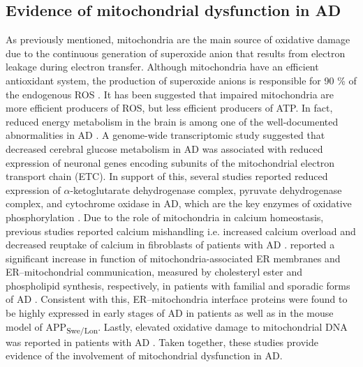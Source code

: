 \subsection{Evidence of mitochondrial dysfunction in AD}
As previously mentioned, mitochondria are the main source of oxidative damage due to the continuous generation of superoxide anion that results from electron leakage during electron transfer. Although mitochondria have an efficient antioxidant system, the production of superoxide anions is responsible for 90 \% of the endogenous ROS \citep{Wang2014}. It has been suggested that impaired mitochondria are more efficient producers of ROS, but less efficient producers of ATP. In fact, reduced energy metabolism in the brain is among one of the well-documented abnormalities in AD \citep{Wang2014}. A genome-wide transcriptomic study suggested that decreased cerebral glucose metabolism in AD was associated with reduced expression of neuronal genes encoding subunits of the mitochondrial electron transport chain (ETC). In support of this, several studies reported reduced expression of $\alpha$-ketoglutarate dehydrogenase complex, pyruvate dehydrogenase complex, and cytochrome oxidase in AD, which are the key enzymes of oxidative phosphorylation \citep{Chandrasekaran1994,Cottrell2001,Maurer2000}. Due to the role of mitochondria in calcium homeostasis, previous studies reported calcium mishandling i.e. increased calcium overload and decreased reuptake of calcium in fibroblasts of patients with AD \citep{Ito1994,Peterson1985}. \citet{Area-Gomez2012} reported a significant increase in function of mitochondria-associated ER membranes and ER–mitochondrial communication, measured by cholesteryl ester and phospholipid synthesis, respectively, in patients with familial and sporadic forms of AD \citep{Area-Gomez2012}. Consistent with this, ER–mitochondria interface proteins were found to be highly expressed in early stages of AD in patients as well as in the mouse model of APP\textsubscript{Swe/Lon}. Lastly, elevated oxidative damage to mitochondrial DNA was reported in patients with AD \citep{Mecocci1994,Wang2005}. Taken together, these studies provide evidence of the involvement of mitochondrial dysfunction in AD.

